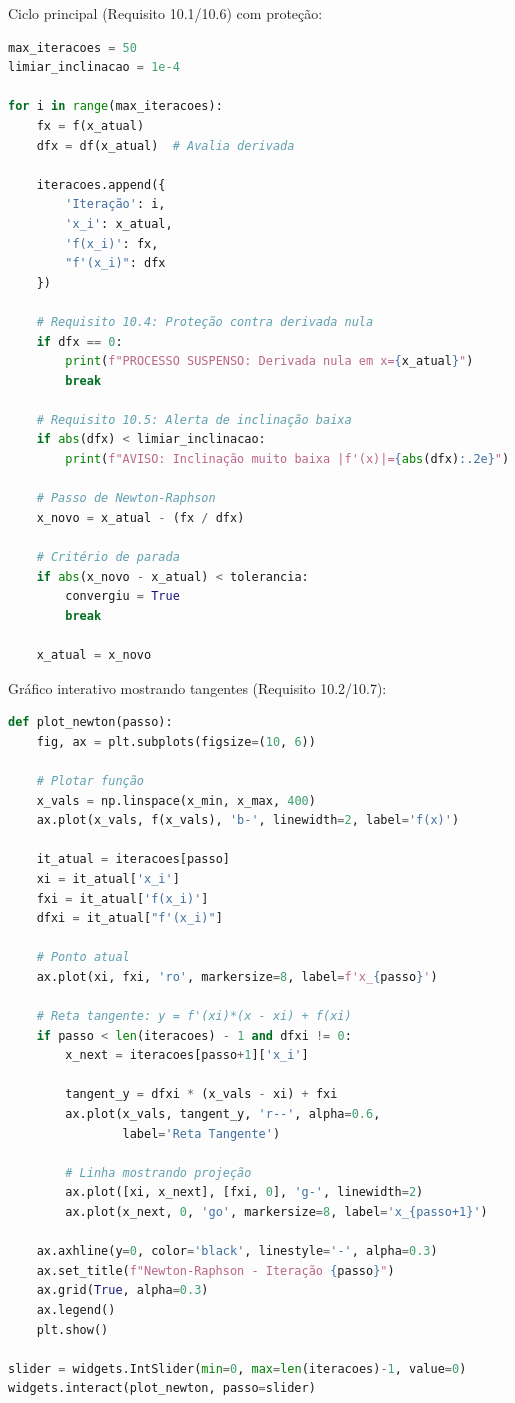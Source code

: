\documentclass[
	12pt,				%
	openright,			%
	oneside,			%
	a4paper,			%
	english,			%
	brazil				%
	]{abntex2}
\begin{document}
Ciclo principal (Requisito 10.1/10.6) com proteção:

\begin{lstlisting}[language=Python, caption={Requisito 10.1/10.6 - Ciclo com Limitador}]
max_iteracoes = 50
limiar_inclinacao = 1e-4

for i in range(max_iteracoes):
    fx = f(x_atual)
    dfx = df(x_atual)  # Avalia derivada
    
    iteracoes.append({
        'Iteração': i,
        'x_i': x_atual,
        'f(x_i)': fx,
        "f'(x_i)": dfx
    })
    
    # Requisito 10.4: Proteção contra derivada nula
    if dfx == 0:
        print(f"PROCESSO SUSPENSO: Derivada nula em x={x_atual}")
        break
    
    # Requisito 10.5: Alerta de inclinação baixa
    if abs(dfx) < limiar_inclinacao:
        print(f"AVISO: Inclinação muito baixa |f'(x)|={abs(dfx):.2e}")
    
    # Passo de Newton-Raphson
    x_novo = x_atual - (fx / dfx)
    
    # Critério de parada
    if abs(x_novo - x_atual) < tolerancia:
        convergiu = True
        break
    
    x_atual = x_novo
\end{lstlisting}

Gráfico interativo mostrando tangentes (Requisito 10.2/10.7):

\begin{lstlisting}[language=Python, caption={Requisito 10.2/10.7 - Gráfico com Tangentes}]
def plot_newton(passo):
    fig, ax = plt.subplots(figsize=(10, 6))
    
    # Plotar função
    x_vals = np.linspace(x_min, x_max, 400)
    ax.plot(x_vals, f(x_vals), 'b-', linewidth=2, label='f(x)')
    
    it_atual = iteracoes[passo]
    xi = it_atual['x_i']
    fxi = it_atual['f(x_i)']
    dfxi = it_atual["f'(x_i)"]
    
    # Ponto atual
    ax.plot(xi, fxi, 'ro', markersize=8, label=f'x_{passo}')
    
    # Reta tangente: y = f'(xi)*(x - xi) + f(xi)
    if passo < len(iteracoes) - 1 and dfxi != 0:
        x_next = iteracoes[passo+1]['x_i']
        
        tangent_y = dfxi * (x_vals - xi) + fxi
        ax.plot(x_vals, tangent_y, 'r--', alpha=0.6, 
                label='Reta Tangente')
        
        # Linha mostrando projeção
        ax.plot([xi, x_next], [fxi, 0], 'g-', linewidth=2)
        ax.plot(x_next, 0, 'go', markersize=8, label='x_{passo+1}')
    
    ax.axhline(y=0, color='black', linestyle='-', alpha=0.3)
    ax.set_title(f"Newton-Raphson - Iteração {passo}")
    ax.grid(True, alpha=0.3)
    ax.legend()
    plt.show()

slider = widgets.IntSlider(min=0, max=len(iteracoes)-1, value=0)
widgets.interact(plot_newton, passo=slider)
\end{lstlisting}
\end{document}
